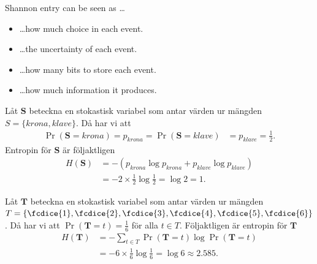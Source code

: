 \documentclass{beamer}
\let\stoch\mathbf{}
\begin{document}
\begin{frame}
  \begin{block}{Shannon entry can be seen as \dots}
    \begin{itemize}
      \item \dots how much choice in each event.

      \item \dots the uncertainty of each event.

      \item \dots how many bits to store each event.

      \item \dots how much information it produces.

    \end{itemize}
  \end{block}
\end{frame}

\begin{frame}
  \begin{example}
    Låt \(\stoch S\) beteckna en stokastisk variabel som antar värden ur 
    mängden \(S = \{krona, klave\}\).
    Då har vi att
    \begin{align*}
      \Pr(\stoch S = krona) = p_{krona} = \Pr(\stoch S = klave) &= p_{klave} 
      = \frac{1}{2}.
    \end{align*}
    Entropin för \(\stoch S\) är följaktligen
    \begin{align*}
      H(\stoch S) &= -\left( p_{krona}\log p_{krona} + p_{klave}\log p_{klave} 
      \right) \\
        &= -2\times \frac{1}{2}\log \frac{1}{2} = \log 2 = 1.
    \end{align*}
  \end{example}
\end{frame}

\begin{frame}
  \begin{example}
    Låt \(\stoch T\) beteckna en stokastisk variabel som antar värden ur 
    mängden \(T = \{\fcdice{1}, \fcdice{2}, \fcdice{3}, \fcdice{4}, \fcdice{5}, 
      \fcdice{6}\}\).
    Då har vi att \(\Pr(\stoch T = t) = \frac{1}{6}\) för alla \(t\in T\).
    Följaktligen är entropin för \(\stoch T\)
    \begin{align*}
      H(\stoch T) &= -\sum_{t\in T} \Pr(\stoch T = t)\log\Pr(\stoch T = t) \\
      &= -6\times \frac{1}{6}\log\frac{1}{6} = \log 6 \approx 2.585.
    \end{align*}
  \end{example}
\end{frame}
\end{document}
